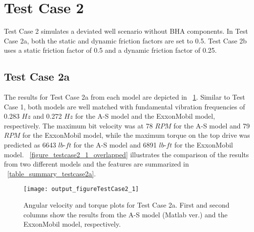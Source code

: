 \section{Test Case 2}
Test Case 2 simulates a deviated well scenario without BHA components. In Test Case 2a, both the static and dynamic friction factors are set to 0.5. Test Case 2b uses a static friction factor of 0.5 and a dynamic friction factor of 0.25.

\subsection{Test Case 2a}
The results for Test Case 2a from each model are depicted in \figurename~\ref{figure_testcase2_1}. Similar to Test Case 1, both models are well matched with fundamental vibration frequencies of 0.283 $Hz$ and 0.272 $Hz$ for the A-S model and the ExxonMobil model, respectively. The maximum bit velocity was at 78 $RPM$ for the A-S model and 79 $RPM$ for the ExxonMobil model, while the maximum torque on the top drive was predicted as 6643 $lb\mbox{-}ft$ for the A-S model and 6891 $lb\mbox{-}ft$ for the ExxonMobil model. \figurename~\ref{figure_testcase2_1_overlapped} illustrates the comparison of the results from two different models and the features are summarized in \tablename~\ref{table_summary_testcase2a}.
\begin{figure}
  \centering
  \texttt{[image: output\_figureTestCase2\_1]}
  \caption[Angular velocity and torque plots for Test Case 2a]{Angular velocity and torque plots for Test Case 2a. First and second columns show the results from the A-S model (Matlab ver.) and the ExxonMobil model, respectively.}\label{figure_testcase2_1}
\end{figure}

